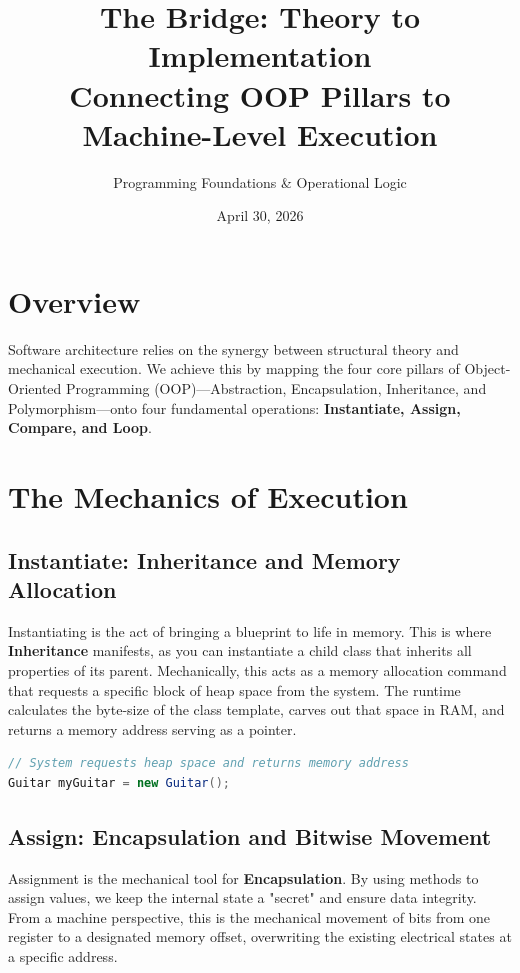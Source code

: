 \documentclass[12pt]{article}
\title{The Bridge: Theory to Implementation \\ \large Connecting OOP Pillars to Machine-Level Execution}
\author{Programming Foundations \& Operational Logic}
\date{April 30, 2026}
\begin{document}
\maketitle

\section{Overview}
Software architecture relies on the synergy between structural theory and mechanical execution. We achieve this by mapping the four core pillars of Object-Oriented Programming (OOP)---Abstraction, Encapsulation, Inheritance, and Polymorphism---onto four fundamental operations: \textbf{Instantiate, Assign, Compare, and Loop}.

\section{The Mechanics of Execution}

\subsection{Instantiate: Inheritance and Memory Allocation}
Instantiating is the act of bringing a blueprint to life in memory. This is where \textbf{Inheritance} manifests, as you can instantiate a child class that inherits all properties of its parent. Mechanically, this acts as a memory allocation command that requests a specific block of heap space from the system. The runtime calculates the byte-size of the class template, carves out that space in RAM, and returns a memory address serving as a pointer.

\begin{lstlisting}[language=Java, caption=Object Initialization and Heap Allocation]
// System requests heap space and returns memory address
Guitar myGuitar = new Guitar(); 
\end{lstlisting}

\subsection{Assign: Encapsulation and Bitwise Movement}
Assignment is the mechanical tool for \textbf{Encapsulation}. By using methods to assign values, we keep the internal state a "secret" and ensure data integrity. From a machine perspective, this is the mechanical movement of bits from one register to a designated memory offset, overwriting the existing electrical states at a specific address.
\end{document}
